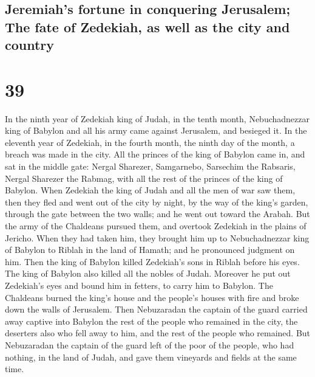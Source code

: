 \begin{paracol}{2}
\switchcolumn
\begin{otherlanguage}{english}

\hypertarget{jeremiahs-fortune-in-conquering-jerusalem-the-fate-of-zedekiah-as-well-as-the-city-and-country}{%
\subsection{Jeremiah's fortune in conquering Jerusalem; The fate of
Zedekiah, as well as the city and
country}\label{jeremiahs-fortune-in-conquering-jerusalem-the-fate-of-zedekiah-as-well-as-the-city-and-country}}

\hypertarget{section-77}{%
\section{39}\label{section-77}}

 In the ninth year of Zedekiah king of Judah, in the tenth
month, Nebuchadnezzar king of Babylon and all his army came against
Jerusalem, and besieged it.  In the eleventh year of
Zedekiah, in the fourth month, the ninth day of the month, a breach was
made in the city.  All the princes of the king of Babylon
came in, and sat in the middle gate: Nergal Sharezer, Samgarnebo,
Sarsechim the Rabsaris, Nergal Sharezer the Rabmag, with all the rest of
the princes of the king of Babylon.  When Zedekiah the
king of Judah and all the men of war saw them, then they fled and went
out of the city by night, by the way of the king's garden, through the
gate between the two walls; and he went out toward the Arabah.
 But the army of the Chaldeans pursued them, and overtook
Zedekiah in the plains of Jericho. When they had taken him, they brought
him up to Nebuchadnezzar king of Babylon to Riblah in the land of
Hamath; and he pronounced judgment on him.  Then the king
of Babylon killed Zedekiah's sons in Riblah before his eyes. The king of
Babylon also killed all the nobles of Judah.  Moreover he
put out Zedekiah's eyes and bound him in fetters, to carry him to
Babylon.  The Chaldeans burned the king's house and the
people's houses with fire and broke down the walls of Jerusalem.
 Then Nebuzaradan the captain of the guard carried away
captive into Babylon the rest of the people who remained in the city,
the deserters also who fell away to him, and the rest of the people who
remained.  But Nebuzaradan the captain of the guard left
of the poor of the people, who had nothing, in the land of Judah, and
gave them vineyards and fields at the same time.


\end{otherlanguage}
\end{paracol}
